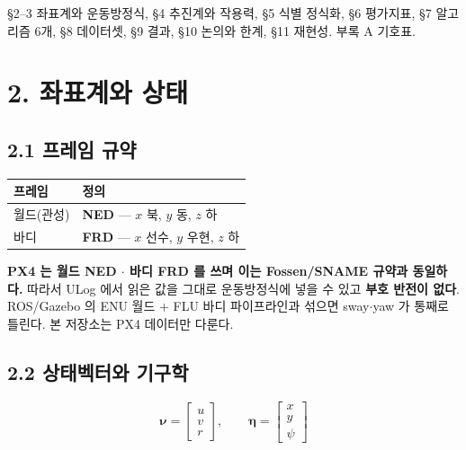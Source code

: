 \documentclass[10pt,a4paper]{article}
\begin{document}
\S{}2--3 좌표계와 운동방정식, \S{}4 추진계와 작용력, \S{}5 식별 정식화, \S{}6 평가지표, \S{}7 알고리즘 6개, \S{}8 데이터셋, \S{}9 결과, \S{}10 논의와 한계, \S{}11 재현성. 부록 A 기호표.

\section*{2. 좌표계와 상태}

\subsection*{2.1 프레임 규약}

\begin{center}\footnotesize\setlength{\tabcolsep}{3pt}
\begin{tabular}{@{}ll@{}}
\toprule
\textbf{프레임} & \textbf{정의} \\
\midrule
월드(관성) & \textbf{NED} --- $x$ 북, $y$ 동, $z$ 하 \\
바디 & \textbf{FRD} --- $x$ 선수, $y$ 우현, $z$ 하 \\
\bottomrule
\end{tabular}
\end{center}

\textbf{PX4 는 월드 NED $\cdot$ 바디 FRD 를 쓰며 이는 Fossen/SNAME 규약과 동일하다.} 따라서 ULog 에서 읽은 값을 그대로 운동방정식에 넣을 수 있고 \textbf{부호 반전이 없다}. ROS/Gazebo 의 ENU 월드 + FLU 바디 파이프라인과 섞으면 sway$\cdot$yaw 가 통째로 틀린다. 본 저장소는 PX4 데이터만 다룬다.

\subsection*{2.2 상태벡터와 기구학}

\begin{equation*}
\boldsymbol{\nu} = \begin{bmatrix} u \\ v \\ r \end{bmatrix}, \qquad
\boldsymbol{\eta} = \begin{bmatrix} x \\ y \\ \psi \end{bmatrix} \tag{1}
\end{equation*}
\end{document}
